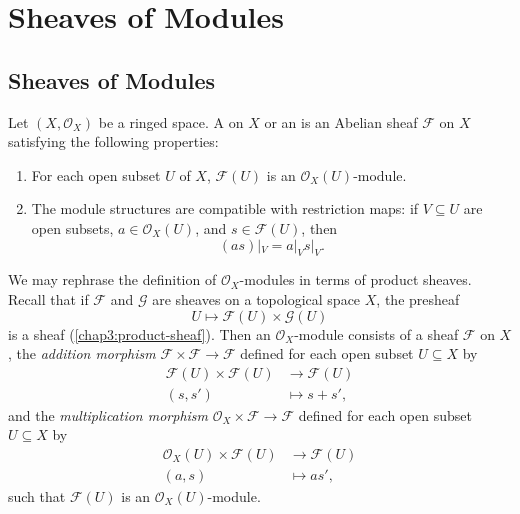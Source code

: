 \chapter{Sheaves of Modules}

\section{Sheaves of Modules}

\begin{definition}
	Let $(X, \mathcal{O}_X)$ be a ringed space. A  on $X$ or an  is an Abelian sheaf $\mathcal{F}$ on $X$ satisfying the following properties:
	\begin{enumerate}
		\item For each open subset $U$ of $X$, $\mathcal{F}(U)$ is an $\mathcal{O}_X(U)$-module.
		
		\item The module structures are compatible with restriction maps: if $V \subseteq U$ are open subsets, $a \in \mathcal{O}_X(U)$, and $s \in \mathcal{F}(U)$, then
		\begin{equation*}
			(as)|_V = a|_V s|_V.
		\end{equation*}
	\end{enumerate}
\end{definition}

We may rephrase the definition of $\mathcal{O}_X$-modules in terms of product sheaves. Recall that if $\mathcal{F}$ and $\mathcal{G}$ are sheaves on a topological space $X$, the presheaf
\begin{equation*}
	U \mapsto \mathcal{F}(U) \times \mathcal{G}(U)
\end{equation*}
is a sheaf (\cref{chap3:product-sheaf}). Then an $\mathcal{O}_X$-module consists of a sheaf $\mathcal{F}$ on $X$, the \textit{addition morphism} $\mathcal{F} \times \mathcal{F} \to \mathcal{F}$ defined for each open subset $U \subseteq X$ by
\begin{align*}
	\mathcal{F}(U) \times \mathcal{F}(U) & \to \mathcal{F}(U) \\
	(s, s') & \mapsto s + s',
\end{align*}
and the \textit{multiplication morphism} $\mathcal{O}_X \times \mathcal{F} \to \mathcal{F}$ defined for each open subset $U \subseteq X$ by
\begin{align*}
	\mathcal{O}_X(U) \times \mathcal{F}(U) & \to \mathcal{F}(U) \\
	(a, s) & \mapsto as',
\end{align*}
such that $\mathcal{F}(U)$ is an $\mathcal{O}_X(U)$-module.

